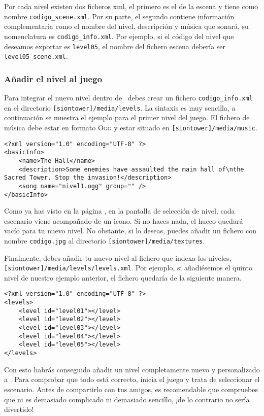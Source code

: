 
Por cada nivel existen dos ficheros xml, el primero es el de la escena
y tiene como nombre \texttt{codigo\_scene.xml}. Por su parte, el segundo
contiene información complementaria como el nombre del nivel, descripción
y música que sonará, su nomenclatura es \texttt{codigo\_info.xml}. Por ejemplo,
si el código del nivel que deseamos exportar es \texttt{level05}, el nombre
del fichero escena debería ser \texttt{level05\_scene.xml}.

\subsubsection*{Añadir el nivel al juego}

Para integrar el nuevo nivel dentro de \juego\ debes crear un fichero
\texttt{codigo\_info.xml} en el directorio \texttt{[siontower]/media/levels}.
La sintaxis es muy sencilla, a continuación se muestra el ejemplo para
el primer nivel del juego. El fichero de música debe estar en formato \textsc{Ogg}
y estar situado en \texttt{[siontower]/media/music}.

\begin{lstlisting}[style=xml]
<?xml version="1.0" encoding="UTF-8" ?>
<basicInfo>
    <name>The Hall</name>
    <description>Some enemies have assaulted the main hall of\nthe Sacred Tower. Stop the invasion!</description>
    <song name="nivel1.ogg" group="" />
</basicInfo>
\end{lstlisting}

Como ya has visto en la página \pageref{sec:levelselection}, en la pantalla
de selección de nivel, cada escenario viene acompañado de un icono. Si no
haces nada, el hueco quedará vacío para tu nuevo nivel. No obstante, si lo deseas,
puedes añadir un fichero con nombre \texttt{codigo.jpg} al directorio
\texttt{[siontower]/media/textures}.

Finalmente, debes añadir tu nuevo nivel al fichero que indexa los niveles,
\texttt{[siontower]/media/levels/levels.xml}. Por ejemplo, si añadiésemos
el quinto nivel de nuestro ejemplo anterior, el fichero quedaría de la
siguiente manera.

\begin{lstlisting}[style=xml]
<?xml version="1.0" encoding="UTF-8" ?>
<levels>
    <level id="level01"></level>
    <level id="level02"></level>
    <level id="level03"></level>
    <level id="level04"></level>
    <level id="level05"></level>
</levels>
\end{lstlisting}

Con esto habrás conseguido añadir un nivel completamente nuevo y personalizado
a \juego. Para comprobar que todo está correcto, inicia el juego y trata
de seleccionar el escenario. Antes de compartirlo con tus amigos, es recomendable
que compruebes que ni es demasiado complicado ni demasiado sencillo, ¡de lo
contrario no sería divertido!


